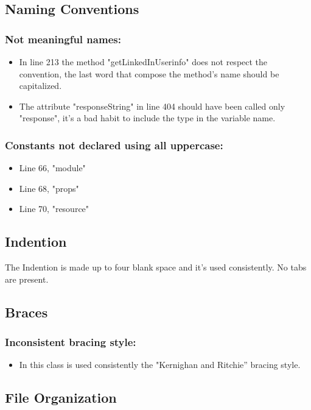 \subsection{Naming Conventions}

\subsubsection{Not meaningful names:}
\begin{itemize}
\item In line 213 the method "getLinkedInUserinfo" does not respect the convention, the last word that compose the method's name should be capitalized.
\item The attribute "responseString" in line 404 should have been called only "response", it's a bad habit to include the type in the variable name.
\end{itemize}
\subsubsection{Constants not declared using all uppercase:}
\begin{itemize}
\item Line 66, "module"
\item Line 68, "props"
\item Line 70, "resource"
\end{itemize}

\subsection{Indention}
The Indention is made up to four blank space and it's used consistently.
No tabs are present.

\subsection{Braces}
\subsubsection{Inconsistent bracing style:}
\begin{itemize}
\item In this class is used consistently the "Kernighan and Ritchie” bracing style.
\end{itemize}



\subsection{File Organization}

